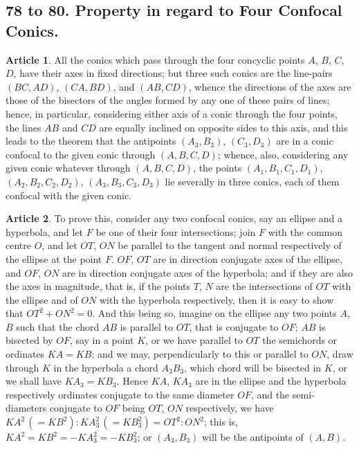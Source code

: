 \documentclass[11pt,a4paper]{article}
\theoremstyle{definition}
\newtheorem{art}{Article}
\begin{document}
\subsection*{78 to 80. Property in regard to Four Confocal Conics.}

\begin{art}
All the conics which pass through the four concyclic points $A$, $B$, $C$, $D$, have their axes in fixed directions; but three such conics are the line-pairs $(BC, AD)$, $(CA, BD)$, and $(AB, CD)$, whence the directions of the axes are those of the bisectors of the angles formed by any one of these pairs of lines; hence, in particular, considering either axis of a conic through the four points, the lines $AB$ and $CD$ are equally inclined on opposite sides to this axis, and this leads to the theorem that the antipoints $(A_{3}, B_{3})$, $(C_{3}, D_{3})$ are in a conic confocal to the given conic through $(A, B, C, D)$; whence, also, considering any given conic whatever through $(A, B, C, D)$, the points $(A_{1}, B_{1}, C_{1}, D_{1})$, $(A_{2}, B_{2}, C_{2}, D_{2})$, $(A_{3}, B_{3}, C_{3}, D_{3})$ lie severally in three conics, each of them confocal with the given conic.
\end{art}

\begin{art}
To prove this, consider any two confocal conics, say an ellipse and a hyperbola, and let $F$ be one of their four intersections; join $F$ with the common centre $O$, and let $OT$, $ON$ be parallel to the tangent and normal respectively of the ellipse at the point $F$. $OF$, $OT$ are in direction conjugate axes of the ellipse, and $OF$, $ON$ are in direction conjugate axes of the hyperbola; and if they are also the axes in magnitude, that is, if the points $T$, $N$ are the intersections of $OT$ with the ellipse and of $ON$ with the hyperbola respectively, then it is easy to show that $OT^{2} + ON^{2} = 0$. And this being so, imagine on the ellipse any two points $A$, $B$ such that the chord $AB$ is parallel to $OT$, that is conjugate to $OF$; $AB$ is bisected by $OF$, say in a point $K$, or we have parallel to $OT$ the semichords or ordinates $KA = KB$; and we may, perpendicularly to this or parallel to $ON$, draw through $K$ in the hyperbola a chord $A_{3}B_{3}$, which chord will be bisected in $K$, or we shall have $KA_{3} = KB_{3}$. Hence $KA$, $KA_{3}$ are in the ellipse and the hyperbola respectively ordinates conjugate to the same diameter $OF$, and the semi-diameters conjugate to $OF$ being $OT$, $ON$ respectively, we have $KA^{2}\, (= KB^{2}) : KA_{3}^{2}\, (= KB_{3}^{2}) = OT^{2} : ON^{2}$; this is, $KA^{2} = KB^{2} = -KA_{3}^{2} = -KB_{3}^{2}$; or $(A_{3}, B_{3})$ will be the antipoints of $(A, B)$.
\end{art}
\end{document}

